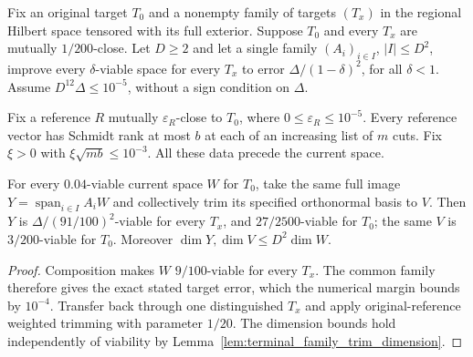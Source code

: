 \begin{theorem}
    \label{thm:terminal_family_original_reference_trim}
    \leanok
    Fix an original target $T_0$ and a nonempty family of targets $(T_x)$
    in the regional Hilbert space tensored with its full exterior.
    Suppose $T_0$ and every $T_x$ are mutually $1/200$-close. Let $D\ge2$
    and let a single family $(A_i)_{i\in I}$, $|I|\le D^2$, improve every
    $\delta$-viable space for every $T_x$ to error
    $\Delta/(1-\delta)^2$, for all $\delta<1$.
    Assume $D^{12}\Delta\le10^{-5}$, without a sign condition on $\Delta$.

    Fix a reference $R$ mutually $\varepsilon_R$-close to $T_0$, where
    $0\le\varepsilon_R\le10^{-5}$. Every reference vector has Schmidt rank
    at most $b$ at each of an increasing list of $m$ cuts. Fix $\xi>0$
    with $\xi\sqrt{mb}\le10^{-3}$. All these data precede the current space.

    For every $0.04$-viable current space $W$ for $T_0$, take the same full
    image $Y=\operatorname{span}_{i\in I}A_iW$ and collectively trim its
    specified orthonormal basis to $V$. Then $Y$ is
    $\Delta/(91/100)^2$-viable for every $T_x$, and $27/2500$-viable for
    $T_0$; the same $V$ is $3/200$-viable for $T_0$. Moreover
    $\dim Y,\dim V\le D^2\dim W$.
\end{theorem}
\begin{proof}\leanok
    Composition makes $W$ $9/100$-viable for every $T_x$. The common family
    therefore gives the exact stated target error, which the numerical
    margin bounds by $10^{-4}$. Transfer back through one distinguished
    $T_x$ and apply original-reference weighted trimming with parameter
    $1/20$. The dimension bounds hold independently of viability by
    Lemma~\ref{lem:terminal_family_trim_dimension}.
\end{proof}
